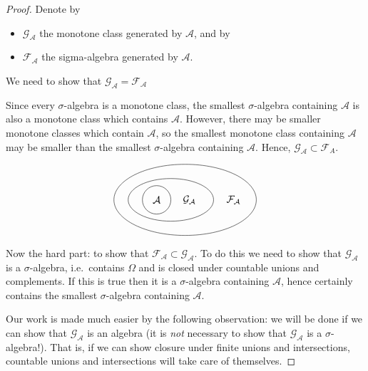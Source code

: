 \documentclass[a4paper]{scrartcl}
\theoremstyle{definition}
\theoremstyle{plain}
\theoremstyle{remark}
\begin{document}
\begin{proof}
  Denote by
  \begin{itemize}
    \item $\mathcal{G}_{\mathcal{A}}$ the monotone class generated by $\mathcal{A}$, and by
    \item $\mathcal{F}_{\mathcal{A}}$ the sigma-algebra generated by $\mathcal{A}$.
  \end{itemize}
  We need to show that $\mathcal{G}_{\mathcal{A}} = \mathcal{F}_{\mathcal{A}}$

  Since every $\sigma$-algebra is a monotone class, the smallest $\sigma$-algebra containing $\mathcal{A}$ is also a monotone class which contains $\mathcal{A}$. However, there may be smaller monotone classes which contain $\mathcal{A}$, so the smallest monotone class containing $\mathcal{A}$ may be smaller than the smallest $\sigma$-algebra containing $\mathcal{A}$. Hence, $\mathcal{G}_{\mathcal{A}} \subset \mathcal{F}_{A}$.

  \begin{equation*}
    \begin{tikzpicture}
      \node at (0, 0) {$\mathcal{A}$};
      \node at (1.15, 0) {$\mathcal{G}_{\mathcal{A}}$};
      \node at (2.7, 0) {$\mathcal{F}_{\mathcal{A}}$};
      \draw (0, 0) circle [radius=0.5];
      \draw (0.5, 0) ellipse (1.5 and 0.75);
      \draw (1, 0) ellipse (2.5 and 1.25);
    \end{tikzpicture}
  \end{equation*}

  Now the hard part: to show that $\mathcal{F}_{\mathcal{A}} \subset \mathcal{G}_{\mathcal{A}}$. To do this we need to show that $\mathcal{G}_{\mathcal{A}}$ is a $\sigma$-algebra, i.e.\ contains $\Omega$ and is closed under countable unions and complements. If this is true then it is a $\sigma$-algebra containing $\mathscr{A}$, hence certainly contains the smallest $\sigma$-algebra containing $\mathscr{A}$.

  Our work is made much easier by the following observation: we will be done if we can show that $\mathcal{G}_{\mathcal{A}}$ is an algebra (it is \emph{not} necessary to show that $\mathcal{G}_{\mathcal{A}}$ is a $\sigma$-algebra!). That is, if we can show closure under finite unions and intersections, countable unions and intersections will take care of themselves.


\end{proof}
\end{document}
